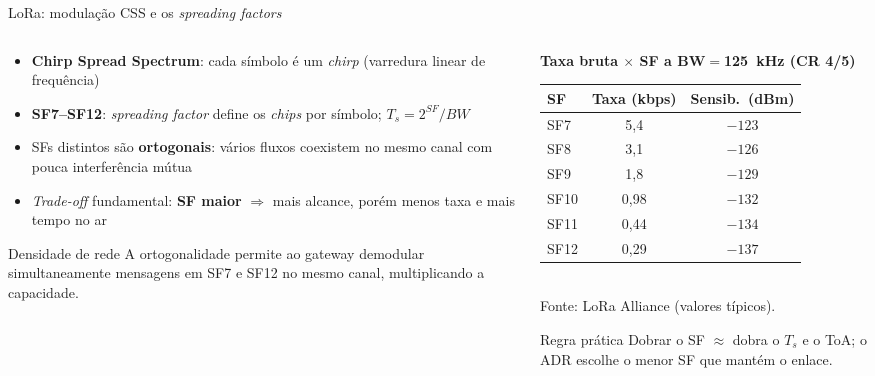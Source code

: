 \documentclass[aspectratio=169,11pt]{beamer}
\begin{document}
\begin{frame}{LoRa: modulação CSS e os \emph{spreading factors}}
  \small
  \begin{columns}
    \begin{column}{0.55\textwidth}
      \begin{itemize}
        \item \textbf{Chirp Spread Spectrum}: cada símbolo é um \emph{chirp} (varredura linear de frequência)
        \item \textbf{SF7--SF12}: \emph{spreading factor} define os \emph{chips} por símbolo; $T_s = 2^{SF}/BW$
        \item SFs distintos são \textbf{ortogonais}: vários fluxos coexistem no mesmo canal com pouca interferência mútua
        \item \emph{Trade-off} fundamental: \textbf{SF maior} $\Rightarrow$ mais alcance, porém menos taxa e mais tempo no ar
      \end{itemize}
      \pause
      \begin{alertblock}{Densidade de rede}
        A ortogonalidade permite ao gateway demodular simultaneamente mensagens em SF7 e SF12 no mesmo canal, multiplicando a capacidade.
      \end{alertblock}
    \end{column}
    \begin{column}{0.45\textwidth}
      \begin{center}
        {\scriptsize\bfseries Taxa bruta $\times$ SF a BW$=$125~kHz (CR 4/5)}\\[1mm]
        \begin{tabular}{lcc}
          \toprule
          \textbf{SF} & \textbf{Taxa (kbps)} & \textbf{Sensib.\ (dBm)}\\
          \midrule
          SF7 & 5,4 & $-123$\\
          SF8 & 3,1 & $-126$\\
          SF9 & 1,8 & $-129$\\
          SF10 & 0,98 & $-132$\\
          SF11 & 0,44 & $-134$\\
          SF12 & 0,29 & $-137$\\
          \bottomrule
        \end{tabular}\\[1mm]
        {\scriptsize Fonte: LoRa Alliance (valores típicos).}
      \end{center}
      \vspace{0.1cm}
      \begin{block}{Regra prática}
        Dobrar o SF $\approx$ dobra o $T_s$ e o ToA; o ADR escolhe o menor SF que mantém o enlace.
      \end{block}
    \end{column}
  \end{columns}
\end{frame}
\end{document}

